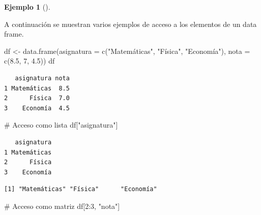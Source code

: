 \documentclass[
  a4paper,
]{scrreport}
\newenvironment{Shaded}{\begin{snugshade}}{\end{snugshade}}
\newcommand{\AttributeTok}[1]{\textcolor[rgb]{0.40,0.45,0.13}{#1}}
\newcommand{\CommentTok}[1]{\textcolor[rgb]{0.37,0.37,0.37}{#1}}
\newcommand{\DecValTok}[1]{\textcolor[rgb]{0.68,0.00,0.00}{#1}}
\newcommand{\FloatTok}[1]{\textcolor[rgb]{0.68,0.00,0.00}{#1}}
\newcommand{\FunctionTok}[1]{\textcolor[rgb]{0.28,0.35,0.67}{#1}}
\newcommand{\NormalTok}[1]{\textcolor[rgb]{0.00,0.23,0.31}{#1}}
\newcommand{\OtherTok}[1]{\textcolor[rgb]{0.00,0.23,0.31}{#1}}
\newcommand{\SpecialCharTok}[1]{\textcolor[rgb]{0.37,0.37,0.37}{#1}}
\newcommand{\StringTok}[1]{\textcolor[rgb]{0.13,0.47,0.30}{#1}}
\theoremstyle{definition}
\newtheorem{example}{Ejemplo}[chapter]
\theoremstyle{definition}
\theoremstyle{remark}
\begin{document}
\leavevmode{}%
\begin{example}[]\label{exm-acceso-data-frame}

A continuación se muestran varios ejemplos de acceso a los elementos de
un data frame.

\begin{Shaded}
\begin{Highlighting}[]
\NormalTok{df }\OtherTok{\textless{}{-}} \FunctionTok{data.frame}\NormalTok{(}\AttributeTok{asignatura =} \FunctionTok{c}\NormalTok{(}\StringTok{"Matemáticas"}\NormalTok{, }\StringTok{"Física"}\NormalTok{, }\StringTok{"Economía"}\NormalTok{), }\AttributeTok{nota =} \FunctionTok{c}\NormalTok{(}\FloatTok{8.5}\NormalTok{, }\DecValTok{7}\NormalTok{, }\FloatTok{4.5}\NormalTok{))}
\NormalTok{df}
\end{Highlighting}
\end{Shaded}

\begin{verbatim}
   asignatura nota
1 Matemáticas  8.5
2      Física  7.0
3    Economía  4.5
\end{verbatim}

\begin{Shaded}
\begin{Highlighting}[]
\CommentTok{\# Acceso como lista}
\NormalTok{df[}\StringTok{"asignatura"}\NormalTok{]}
\end{Highlighting}
\end{Shaded}

\begin{verbatim}
   asignatura
1 Matemáticas
2      Física
3    Economía
\end{verbatim}

\begin{Shaded}
\end{Shaded}

\begin{verbatim}
[1] "Matemáticas" "Física"      "Economía"   
\end{verbatim}

\begin{Shaded}
\begin{Highlighting}[]
\CommentTok{\# Acceso como matriz}
\NormalTok{df[}\DecValTok{2}\SpecialCharTok{:}\DecValTok{3}\NormalTok{, }\StringTok{"nota"}\NormalTok{]}
\end{Highlighting}
\end{Shaded}


\end{example}
\end{document}
